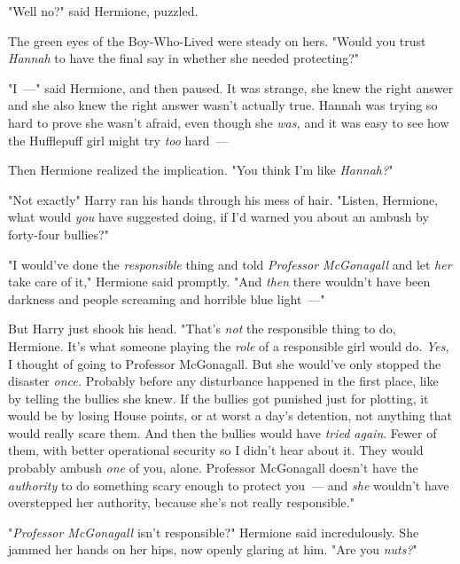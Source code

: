 "Well{\el} no?" said Hermione, puzzled.

The green eyes of the Boy-Who-Lived were steady on hers. "Would you trust
\emph{Hannah} to have the final say in whether she needed protecting?"

"I~---" said Hermione, and then paused. It was strange, she knew the right
answer and she also knew the right answer wasn't actually true. Hannah was
trying so hard to prove she wasn't afraid, even though she \emph{was,} and it
was easy to see how the Hufflepuff girl might try \emph{too} hard~---

Then Hermione realized the implication. "You think I'm like \emph{Hannah?}"

"Not{\el} exactly{\el}" Harry ran his hands through his mess of hair.
"Listen, Hermione, what would \emph{you} have suggested doing, if I'd warned
you about an ambush by forty-four bullies?"

"I would've done the \emph{responsible} thing and told \emph{Professor
McGonagall} and let \emph{her} take care of it," Hermione said promptly. "And
\emph{then} there wouldn't have been darkness and people screaming and horrible
blue light~---"

But Harry just shook his head. "That's \emph{not} the responsible thing to do,
Hermione. It's what someone playing the \emph{role} of a responsible girl would
do. \emph{Yes}, I thought of going to Professor McGonagall. But she would've
only stopped the disaster \emph{once.} Probably before any disturbance happened
in the first place, like by telling the bullies she knew. If the bullies got
punished just for plotting, it would be by losing House points, or at worst a
day's detention, not anything that would really scare them. And then the
bullies would have \emph{tried again}. Fewer of them, with better operational
security so I didn't hear about it. They would probably ambush \emph{one} of
you, alone. Professor McGonagall doesn't have the \emph{authority} to do
something scary enough to protect you~--- and \emph{she} wouldn't have
overstepped her authority, because she's not really responsible."

"\emph{Professor McGonagall} isn't responsible?" Hermione said incredulously.
She jammed her hands on her hips, now openly glaring at him. "Are you
\emph{nuts?}"

